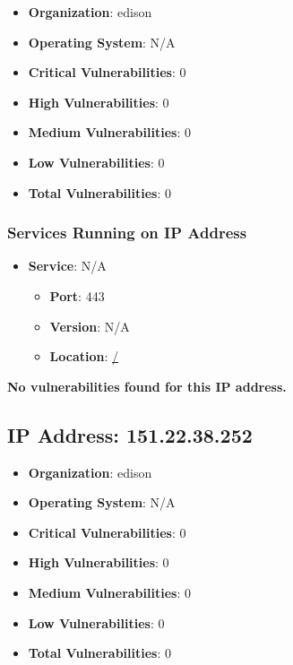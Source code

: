 \documentclass{article}
\begin{document}
\begin{itemize}
    \item \textbf{Organization}: edison
    \item \textbf{Operating System}:  N/A 
    \item \textbf{Critical Vulnerabilities}: 0
    \item \textbf{High Vulnerabilities}: 0
    \item \textbf{Medium Vulnerabilities}: 0
    \item \textbf{Low Vulnerabilities}: 0
    \item \textbf{Total Vulnerabilities}: 0
\end{itemize}

\subsubsection*{Services Running on IP Address}

\begin{itemize}
    
        \item \textbf{Service}: N/A
        \begin{itemize}
            \item \textbf{Port}: 443
            \item \textbf{Version}:  N/A 
            \item \textbf{Location}: \href{ / }{ / }
        \end{itemize}
    
\end{itemize}


\textbf{No vulnerabilities found for this IP address.}




\clearpage



\subsection*{IP Address: 151.22.38.252}

\begin{itemize}
    \item \textbf{Organization}: edison
    \item \textbf{Operating System}:  N/A 
    \item \textbf{Critical Vulnerabilities}: 0
    \item \textbf{High Vulnerabilities}: 0
    \item \textbf{Medium Vulnerabilities}: 0
    \item \textbf{Low Vulnerabilities}: 0
    \item \textbf{Total Vulnerabilities}: 0
\end{itemize}
\end{document}
